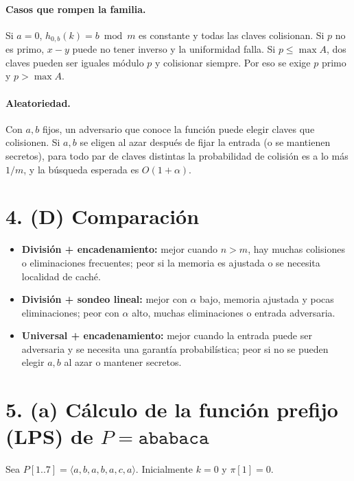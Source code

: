 \documentclass[11pt]{article}
\begin{document}
\paragraph{Casos que rompen la familia.}
Si \(a=0\), \(h_{0,b}(k)=b\bmod m\) es constante y todas las claves colisionan. Si \(p\) no es primo, \(x-y\) puede no tener inverso y la uniformidad falla. Si \(p\le\max A\), dos claves pueden ser iguales módulo \(p\) y colisionar siempre. Por eso se exige \(p\) primo y \(p>\max A\).

\paragraph{Aleatoriedad.}
Con \(a,b\) fijos, un adversario que conoce la función puede elegir claves que colisionen. Si \(a,b\) se eligen al azar después de fijar la entrada (o se mantienen secretos), para todo par de claves distintas la probabilidad de colisión es a lo más \(1/m\), y la búsqueda esperada es \(O(1+\alpha)\).

\section*{4. (D) Comparación}

\begin{itemize}[itemsep=0.2em]
\item \textbf{División + encadenamiento:} mejor cuando \(n>m\), hay muchas colisiones o eliminaciones frecuentes; peor si la memoria es ajustada o se necesita localidad de caché.
\item \textbf{División + sondeo lineal:} mejor con \(\alpha\) bajo, memoria ajustada y pocas eliminaciones; peor con \(\alpha\) alto, muchas eliminaciones o entrada adversaria.
\item \textbf{Universal + encadenamiento:} mejor cuando la entrada puede ser adversaria y se necesita una garantía probabilística; peor si no se pueden elegir \(a,b\) al azar o mantener secretos.
\end{itemize}

\section*{5. (a) Cálculo de la función prefijo (LPS) de \(P=\texttt{ababaca}\)}

Sea \(P[1..7]=\langle a,b,a,b,a,c,a\rangle\). Inicialmente \(k=0\) y \(\pi[1]=0\).
\end{document}
